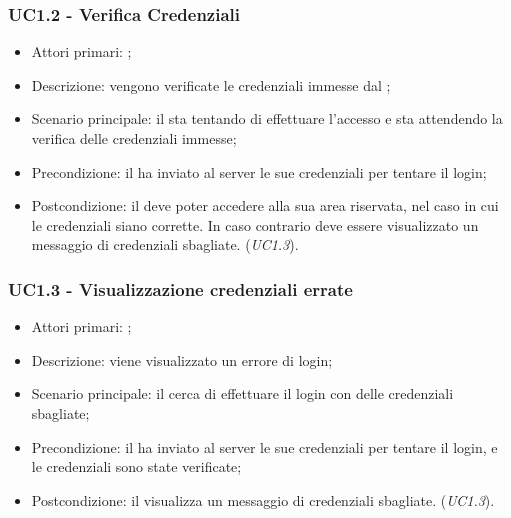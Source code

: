 \documentclass[../analisi-dei-requisiti]{subfiles}
\begin{document}
\subsubsection{UC1.2 - Verifica Credenziali}
\label{subsub:UC1.2}

\begin{itemize}
\item Attori primari: ;
\item Descrizione: vengono verificate le credenziali immesse dal ;
\item Scenario principale: il  sta tentando di effettuare l'accesso e sta attendendo la verifica delle credenziali immesse;
\item Precondizione: il  ha inviato al server le sue credenziali per tentare il login;
\item Postcondizione: il  deve poter accedere alla sua area riservata, nel caso in cui le credenziali siano corrette. In caso
contrario deve essere visualizzato un messaggio di credenziali sbagliate. (\emph{UC1.3}).

\end{itemize}

\subsubsection{UC1.3 - Visualizzazione credenziali errate}
\label{subsub:UC1.3}

\begin{itemize}
\item Attori primari: ;
\item Descrizione: viene visualizzato un errore di login;
\item Scenario principale: il  cerca di effettuare il login con delle credenziali sbagliate;
\item Precondizione: il  ha inviato al server le sue credenziali per tentare il login, e le credenziali sono state verificate;
\item Postcondizione: il  visualizza un messaggio di credenziali sbagliate. (\emph{UC1.3}).

\end{itemize}
\end{document}
